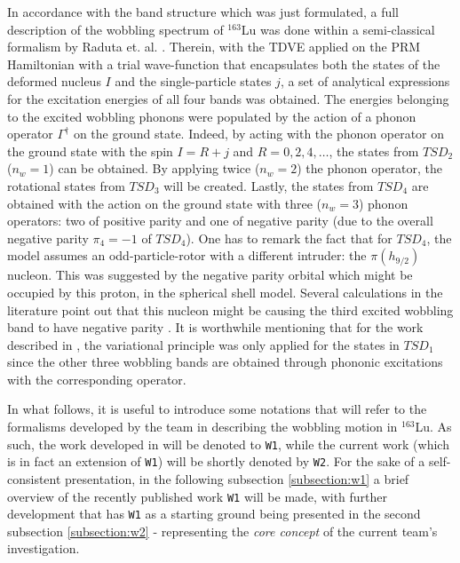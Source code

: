 \documentclass[11pt]{article}
\begin{document}
In accordance with the band structure which was just formulated, a full description of the wobbling spectrum of $^{163}$Lu was done within a semi-classical formalism by Raduta et. al. \cite{raduta2017semiclassical}. Therein, with the TDVE applied on the PRM Hamiltonian with a trial wave-function that encapsulates both the states of the deformed nucleus $I$ and the single-particle states $j$, a set of analytical expressions for the excitation energies of all four bands was obtained. The energies belonging to the excited wobbling phonons were populated by the action of a phonon operator $\Gamma^\dagger$ on the ground state. Indeed, by acting with the phonon operator on the ground state with the spin $I=R+j$ and $R=0,2,4,\dots$, the states from $TSD_2$ ($n_w=1$) can be obtained. By applying twice ($n_w=2$) the phonon operator, the rotational states from $TSD_3$ will be created. Lastly, the states from $TSD_4$ are obtained with the action on the ground state with three ($n_w=3$) phonon operators: two of positive parity and one of negative parity (due to the overall negative parity $\pi_4=-1$ of $TSD_4$). One has to remark the fact that for $TSD_4$, the model assumes an odd-particle-rotor with a different intruder: the $\pi(h_{9/2})$ nucleon. This was suggested by the negative parity orbital which might be occupied by this proton, in the spherical shell model. Several calculations in the literature point out that this nucleon might be causing the third excited wobbling band to have negative parity \cite{jensen2004coexisting}. It is worthwhile mentioning that for the work described in \cite{raduta2017semiclassical}, the variational principle was only applied for the states in $TSD_1$ since the other three wobbling bands are obtained through phononic excitations with the corresponding operator.

In what follows, it is useful to introduce some notations that will refer to the formalisms developed by the team in describing the wobbling motion in $^{163}$Lu. As such, the work developed in \cite{raduta2020approach,raduta2020towards} will be denoted to \texttt{W1}, while the current work (which is in fact an extension of \texttt{W1}) will be shortly denoted by \texttt{W2}. For the sake of a self-consistent presentation, in the following subsection \ref{subsection:w1} a brief overview of the recently published work \texttt{W1} will be made, with further development that has \texttt{W1} as a starting ground being presented in the second subsection \ref{subsection:w2} - representing the \emph{core concept} of the current team's investigation.
\end{document}
